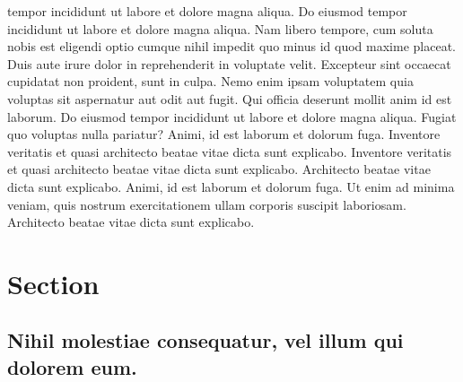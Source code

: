 tempor incididunt ut labore et dolore magna aliqua. Do eiusmod tempor
incididunt ut labore et dolore magna aliqua. Nam libero tempore, cum
soluta nobis est eligendi optio cumque nihil impedit quo minus id quod
maxime placeat. Duis aute irure dolor in reprehenderit in voluptate
velit. Excepteur sint occaecat cupidatat non proident, sunt in culpa.
Nemo enim ipsam voluptatem quia voluptas sit aspernatur aut odit aut
fugit. Qui officia deserunt mollit anim id est laborum. Do eiusmod
tempor incididunt ut labore et dolore magna aliqua. Fugiat quo voluptas
nulla pariatur? Animi, id est laborum et dolorum fuga. Inventore
veritatis et quasi architecto beatae vitae dicta sunt explicabo.
Inventore veritatis et quasi architecto beatae vitae dicta sunt
explicabo. Architecto beatae vitae dicta sunt explicabo. Animi, id est
laborum et dolorum fuga. Ut enim ad minima veniam, quis nostrum
exercitationem ullam corporis suscipit laboriosam. Architecto beatae
vitae dicta sunt explicabo.

\section{Section}\label{section-1.2}

\subsection{Nihil molestiae consequatur, vel illum qui dolorem
eum.}\label{nihil-molestiae-consequatur-vel-illum-qui-dolorem-eum.}


